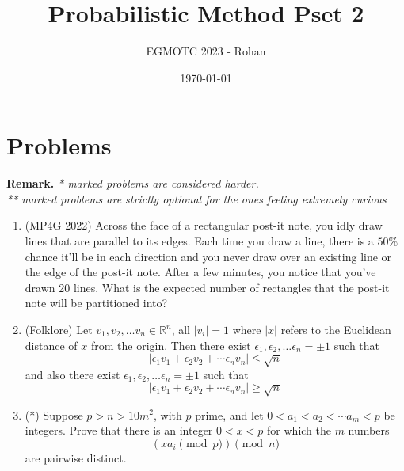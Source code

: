 \documentclass[12pt]{article}
\title{Probabilistic Method Pset 2}
\author{EGMOTC 2023 - Rohan}
\date{\today}
\begin{document}
\maketitle

\newcommand{\localtextbulletone}{\textcolor{black}{\raisebox{.45ex}{\rule{.6ex}{.6ex}}}}
\renewcommand{\labelitemi}{\localtextbulletone}

\section*{Problems}
\vspace{1cm}
\thispagestyle{empty}

\textbf{Remark.} \textit{* marked problems are considered harder.\\ ** marked problems are strictly optional for the ones feeling extremely curious}

\begin{enumerate}
    \item (MP4G 2022) Across the face of a rectangular post-it note, you idly draw lines that are parallel to its edges. Each time you draw a line, there is a $50\%$ chance it'll be in each direction and you never draw over an existing line or the edge of the post-it note. After a few minutes, you notice that you've drawn 20 lines. What is the expected number of rectangles that the post-it note will be partitioned into?
    \item (Folklore) Let $v_1,v_2,\ldots v_n\in \mathbb{R}^n$, all $|v_i|=1$ where $|x|$ refers to the Euclidean distance of $x$ from the origin.  Then there exist $\epsilon_1, \epsilon_2, \ldots \epsilon_n = \pm 1$ such that \[|\epsilon_1v_1+\epsilon_2v_2+\cdots \epsilon_nv_n|\le \sqrt{n}\] and also there exist $\epsilon_1, \epsilon_2, \ldots \epsilon_n = \pm 1$ such that \[|\epsilon_1v_1+\epsilon_2v_2+\cdots \epsilon_nv_n|\ge \sqrt{n}\] 
    \item (*) Suppose $p>n>10m^2$, with $p$ prime, and let $0<a_1<a_2<\cdots a_m<p$ be integers. Prove that there is an integer $0<x<p$ for which the $m$ numbers \[(xa_i \pmod{p})\pmod n\] are pairwise distinct.
\end{enumerate}
\end{document}
